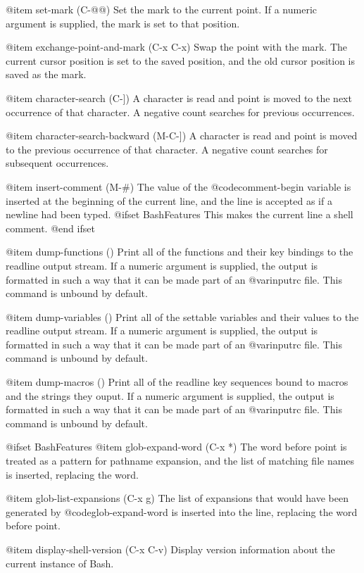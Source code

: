 {{{@item set-mark (C-@@)
Set the mark to the current point.  If a
numeric argument is supplied, the mark is set to that position.

@item exchange-point-and-mark (C-x C-x)
Swap the point with the mark.  The current cursor position is set to
the saved position, and the old cursor position is saved as the mark.

@item character-search (C-])
A character is read and point is moved to the next occurrence of that
character.  A negative count searches for previous occurrences.

@item character-search-backward (M-C-])
A character is read and point is moved to the previous occurrence
of that character.  A negative count searches for subsequent
occurrences.

@item insert-comment (M-#)
The value of the @code{comment-begin}
variable is inserted at the beginning of the current line,
and the line is accepted as if a newline had been typed.
@ifset BashFeatures
This makes the current line a shell comment.
@end ifset

@item dump-functions ()
Print all of the functions and their key bindings to the
readline output stream.  If a numeric argument is supplied,
the output is formatted in such a way that it can be made part
of an @var{inputrc} file.  This command is unbound by default.

@item dump-variables ()
Print all of the settable variables and their values to the
readline output stream.  If a numeric argument is supplied,
the output is formatted in such a way that it can be made part
of an @var{inputrc} file.  This command is unbound by default.

@item dump-macros ()
Print all of the readline key sequences bound to macros and the
strings they ouput.  If a numeric argument is supplied,
the output is formatted in such a way that it can be made part
of an @var{inputrc} file.  This command is unbound by default.

@ifset BashFeatures
@item glob-expand-word (C-x *)
The word before point is treated as a pattern for pathname expansion,
and the list of matching file names is inserted, replacing the word.

@item glob-list-expansions (C-x g)
The list of expansions that would have been generated by
@code{glob-expand-word}
is inserted into the line, replacing the word before point.

@item display-shell-version (C-x C-v)
Display version information about the current instance of Bash.

}}}
